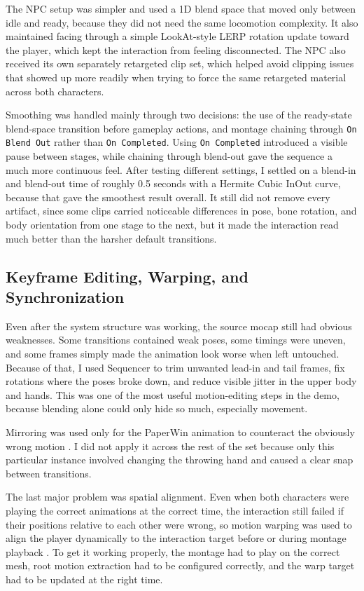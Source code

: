The NPC setup was simpler and used a 1D blend space that moved only between idle and ready, because they did not need the same locomotion complexity. It also maintained facing through a simple LookAt-style LERP rotation update toward the player, which kept the interaction from feeling disconnected. The NPC also received its own separately retargeted clip set, which helped avoid clipping issues that showed up more readily when trying to force the same retargeted material across both characters.

Smoothing was handled mainly through two decisions: the use of the ready-state blend-space transition before gameplay actions, and montage chaining through \texttt{On Blend Out} rather than \texttt{On Completed}. Using \texttt{On Completed} introduced a visible pause between stages, while chaining through blend-out gave the sequence a much more continuous feel. After testing different settings, I settled on a blend-in and blend-out time of roughly 0.5 seconds with a Hermite Cubic InOut curve, because that gave the smoothest result overall. It still did not remove every artifact, since some clips carried noticeable differences in pose, bone rotation, and body orientation from one stage to the next, but it made the interaction read much better than the harsher default transitions.

\subsection{Keyframe Editing, Warping, and Synchronization}

Even after the system structure was working, the source mocap still had obvious weaknesses. Some transitions contained weak poses, some timings were uneven, and some frames simply made the animation look worse when left untouched. Because of that, I used Sequencer to trim unwanted lead-in and tail frames, fix rotations where the poses broke down, and reduce visible jitter in the upper body and hands. This was one of the most useful motion-editing steps in the demo, because blending alone could only hide so much, especially movement.

Mirroring was used only for the PaperWin animation to counteract the obviously wrong motion \cite{epic_mirror_animation}. I did not apply it across the rest of the set because only this particular instance involved changing the throwing hand and caused a clear snap between transitions.

The last major problem was spatial alignment. Even when both characters were playing the correct animations at the correct time, the interaction still failed if their positions relative to each other were wrong, so motion warping was used to align the player dynamically to the interaction target before or during montage playback \cite{epic_motion_warping}. To get it working properly, the montage had to play on the correct mesh, root motion extraction had to be configured correctly, and the warp target had to be updated at the right time.

